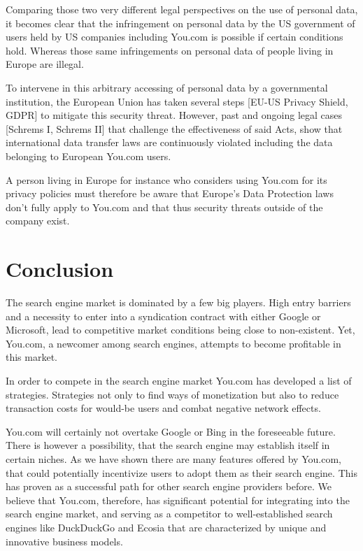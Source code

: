 \documentclass[5p,twocolumn,final]{elsarticle}
\begin{document}
Comparing those two very different legal perspectives on the use of personal data, it becomes clear that the infringement on personal data by the US government of users held by US companies including You.com is possible if certain conditions hold. Whereas those same infringements on personal data of people living in Europe are illegal. \par
To intervene in this arbitrary accessing of personal data by a governmental institution, the European Union has taken several steps [EU-US Privacy Shield, GDPR] to mitigate this security threat. However, past and ongoing legal cases [Schrems I, Schrems II] that challenge the effectiveness of said Acts, show that international data transfer laws are continuously violated including the data belonging to European You.com users.\par
A person living in Europe for instance who considers using You.com for its privacy policies must therefore be aware that Europe's Data Protection laws don't fully apply to You.com and that thus security threats outside of the company exist.

\section{Conclusion}
The search engine market is dominated by a few big players. High entry barriers and a necessity to enter into a syndication contract with either Google or Microsoft, lead to competitive market conditions being close to non-existent. Yet, You.com, a newcomer among search engines, attempts to  become profitable in this market. \par
%
In order to compete in the search engine market You.com has developed a list of strategies. Strategies not only to find ways of monetization but also to reduce transaction costs for would-be users and combat negative network effects.\par 
%
You.com will certainly not overtake Google or Bing in the foreseeable future. There is however a possibility, that the search engine may establish itself in certain niches. As we have shown there are many features offered by You.com, that could potentially incentivize users to adopt them as their search engine. This has proven as a successful path for other search engine providers before. We believe that You.com, therefore, has significant potential for integrating into the search engine market, and serving as a competitor to well-established search engines like DuckDuckGo and Ecosia that are characterized by unique and innovative business models.




\setlength{\bibsep}{1.0em}

\end{document}
